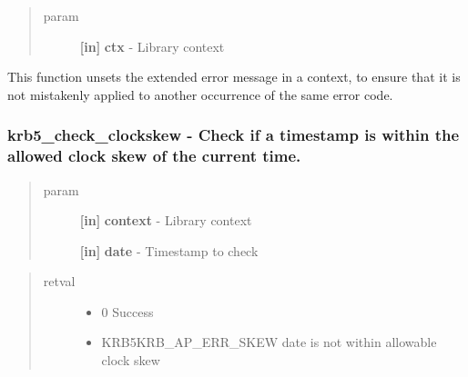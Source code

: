 \documentclass[letterpaper,10pt,english]{sphinxmanual}
\begin{document}
\begin{fulllineitems}
\label{appdev/refs/api/krb5_clear_error_message:c.krb5_clear_error_message}
\end{fulllineitems}

\begin{quote}\begin{description}
\item[{param}] \leavevmode
\textbf{{[}in{]}} \textbf{ctx} - Library context

\end{description}\end{quote}

This function unsets the extended error message in a context, to ensure that it is not mistakenly applied to another occurrence of the same error code.


\subsubsection{krb5\_check\_clockskew -  Check if a timestamp is within the allowed clock skew of the current time.}
\label{appdev/refs/api/krb5_check_clockskew:krb5-check-clockskew-check-if-a-timestamp-is-within-the-allowed-clock-skew-of-the-current-time}\label{appdev/refs/api/krb5_check_clockskew::doc}

\begin{fulllineitems}
\label{appdev/refs/api/krb5_check_clockskew:c.krb5_check_clockskew}
\end{fulllineitems}

\begin{quote}\begin{description}
\item[{param}] \leavevmode
\textbf{{[}in{]}} \textbf{context} - Library context

\textbf{{[}in{]}} \textbf{date} - Timestamp to check

\end{description}\end{quote}
\begin{quote}\begin{description}
\item[{retval}] \leavevmode\begin{itemize}
\item {} 
0   Success

\item {} 
KRB5KRB\_AP\_ERR\_SKEW    date is not within allowable clock skew

\end{itemize}

\end{description}\end{quote}
\end{document}
